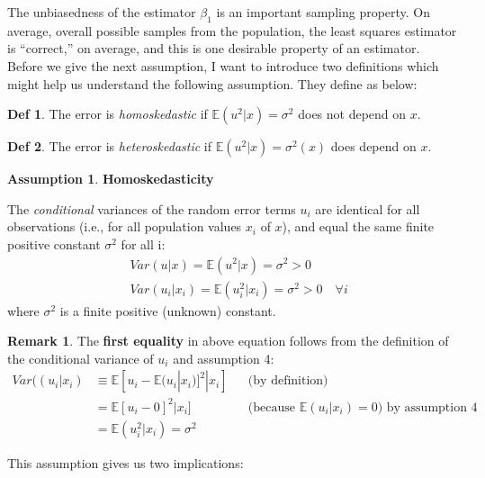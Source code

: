 \documentclass[a4paper, 10pt]{article}
\theoremstyle{definition}	%
\newtheorem*{definition}{Def}
\newtheorem{assumption}{Assumption}
\newtheorem*{remark}{Remark}
\begin{document}
The unbiasedness of the estimator $\beta_1$ is an important sampling property. On average, overall possible samples from the population, the least squares estimator is “correct,” on average, and this is one desirable property of an estimator.\\
Before we give the next assumption, I want to introduce two definitions which might help us understand the following assumption. They define as below:
\begin{definition}
    The error is \textit{homoskedastic} if $\mathbb{E}(u^2|x) = \sigma^2 $ does not depend on $x$.
\end{definition}
\begin{definition}
    The error is \textit{heteroskedastic} if $\mathbb{E}(u^2|x) = \sigma^2(x) $ does depend on $x$.
\end{definition}
\begin{assumption}
    \textbf{Homoskedasticity}
\end{assumption}
The \textit{conditional} variances of the random error terms $u_i$ are identical for all
observations (i.e., for all population values $x_i$ of $x$), and equal the same finite positive constant $\sigma^2$ for all i:
\begin{align*}
    &Var(u|x) = \mathbb{E}(u^2|x) = \sigma^2 > 0\\
    &Var(u_i|x_i) = \mathbb{E}(u_i^2|x_i) = \sigma^2 > 0 \quad \forall i
\end{align*}
where $\sigma^2$ is a finite positive (unknown) constant.
\begin{remark}
The \textbf{first equality} in above equation follows from the definition of the conditional variance of $u_i$ and assumption 4:
\begin{align*}
    Var((u_i|x_i) &\equiv \mathbb{E}{[u_i - \mathbb{E}(u_i|x_i)]^2|x_i]}
    && \text{(by definition)}\\
    &= \mathbb{E}{[u_i - 0]^2|x_i]}
    && \text{(because $\mathbb{E}(u_i|x_i) = 0$) by assumption 4}\\
    &= \mathbb{E}(u_i^2|x_i) = \sigma^2
\end{align*}
\end{remark}
This assumption gives us two implications:
\end{document}
